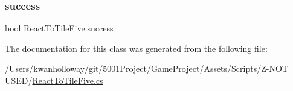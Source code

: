 \subsubsection{\texorpdfstring{success}{success}}
{\footnotesize\ttfamily bool React\+To\+Tile\+Five.\+success}



The documentation for this class was generated from the following file\+:\begin{DoxyCompactItemize}
\item 
/\+Users/kwanholloway/git/5001\+Project/\+Game\+Project/\+Assets/\+Scripts/\+Z-\/\+N\+O\+T U\+S\+E\+D/\hyperlink{_react_to_tile_five_8cs}{React\+To\+Tile\+Five.\+cs}\end{DoxyCompactItemize}
